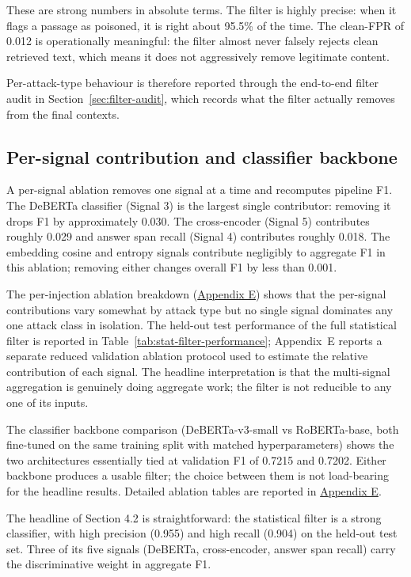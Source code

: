 These are strong numbers in absolute terms. The filter is highly precise: when it flags a passage as poisoned, it is right about 95.5\% of the time. The clean-FPR of 0.012 is operationally meaningful: the filter almost never falsely rejects clean retrieved text, which means it does not aggressively remove legitimate content.

Per-attack-type behaviour is therefore reported through the end-to-end filter audit in Section~\ref{sec:filter-audit}, which records what the filter actually removes from the final contexts.

\subsection{Per-signal contribution and classifier backbone}

A per-signal ablation removes one signal at a time and recomputes pipeline F1. The DeBERTa classifier (Signal 3) is the largest single contributor: removing it drops F1 by approximately 0.030. The cross-encoder (Signal 5) contributes roughly 0.029 and answer span recall (Signal 4) contributes roughly 0.018. The embedding cosine and entropy signals contribute negligibly to aggregate F1 in this ablation; removing either changes overall F1 by less than 0.001.

The per-injection ablation breakdown (\hyperref[app:additional-results]{Appendix E}) shows that the per-signal contributions vary somewhat by attack type but no single signal dominates any one attack class in isolation. The held-out test performance of the full statistical filter is reported in Table~\ref{tab:stat-filter-performance}; Appendix~E reports a separate reduced validation ablation protocol used to estimate the relative contribution of each signal. The headline interpretation is that the multi-signal aggregation is genuinely doing aggregate work; the filter is not reducible to any one of its inputs.

The classifier backbone comparison (DeBERTa-v3-small vs RoBERTa-base, both fine-tuned on the same training split with matched hyperparameters) shows the two architectures essentially tied at validation F1 of 0.7215 and 0.7202. Either backbone produces a usable filter; the choice between them is not load-bearing for the headline results. Detailed ablation tables are reported in \hyperref[app:additional-results]{Appendix E}.

The headline of Section 4.2 is straightforward: the statistical filter is a strong classifier, with high precision (0.955) and high recall (0.904) on the held-out test set. Three of its five signals (DeBERTa, cross-encoder, answer span recall) carry the discriminative weight in aggregate F1.

